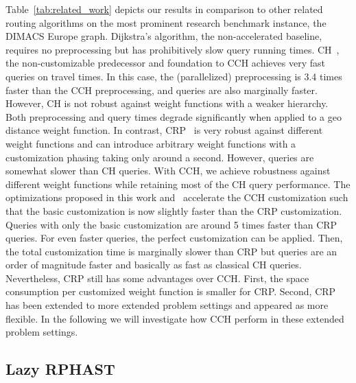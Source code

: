 \documentclass[a4paper, english, cleveref]{lipics-v2021}
\begin{document}
Table~\ref{tab:related_work} depicts our results in comparison to other related routing algorithms on the most prominent research benchmark instance, the DIMACS Europe graph.
Dijkstra's algorithm, the non-accelerated baseline, requires no preprocessing but has prohibitively slow query running times.
CH~\cite{GeisbergerSSV12}, the non-customizable predecessor and foundation to CCH achieves very fast queries on travel times.
In this case, the (parallelized) preprocessing is 3.4 times faster than the CCH preprocessing, and queries are also marginally faster.
However, CH is not robust against weight functions with a weaker hierarchy.
Both preprocessing and query times degrade significantly when applied to a geo distance weight function.
In contrast, CRP~\cite{DellingGPW17} is very robust against different weight functions and can introduce arbitrary weight functions with a customization phasing taking only around a second.
However, queries are somewhat slower than CH queries.
With CCH, we achieve robustness against different weight functions while retaining most of the CH query performance.
The optimizations proposed in this work and~\cite{BuchholdSW19} accelerate the CCH customization such that the basic customization is now slightly faster than the CRP customization.
Queries with only the basic customization are around 5 times faster than CRP queries.
For even faster queries, the perfect customization can be applied.
Then, the total customization time is marginally slower than CRP but queries are an order of magnitude faster and basically as fast as classical CH queries.
Nevertheless, CRP still has some advantages over CCH.
First, the space consumption per customized weight function is smaller for CRP.
Second, CRP has been extended to more extended problem settings and appeared as more flexible.
In the following we will investigate how CCH perform in these extended problem settings.

\subsection{Lazy RPHAST}
\end{document}
